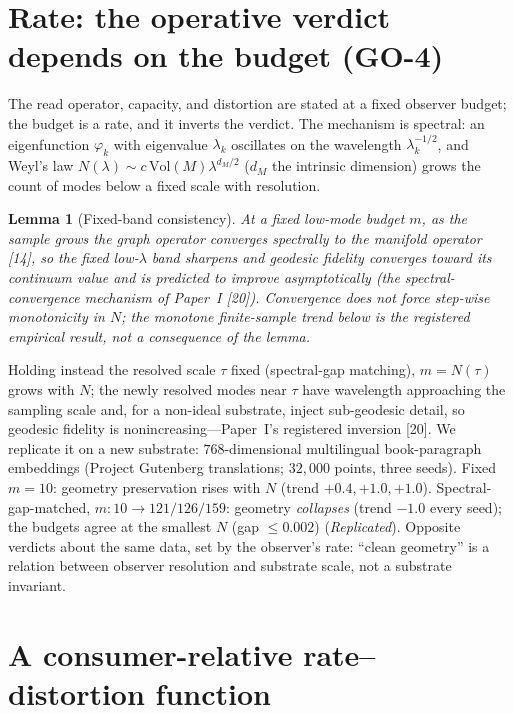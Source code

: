 \documentclass[lettersize,onecolumn]{IEEEtran}
\newtheorem{lemma}{Lemma}
\theoremstyle{definition}
\theoremstyle{remark}
\begin{document}
\section{Rate: the operative verdict depends on the budget (GO-4)}\label{sec:rate}

The read operator, capacity, and distortion are stated at a fixed observer budget;
the budget is a rate, and it inverts the verdict. The mechanism is spectral: an
eigenfunction $\varphi_k$ with eigenvalue $\lambda_k$ oscillates on the wavelength
$\lambda_k^{-1/2}$, and Weyl's law $N(\lambda)\sim c\,\mathrm{Vol}(M)\lambda^{d_M/2}$
($d_M$ the intrinsic dimension) grows the count of modes below a fixed scale with
resolution.

\begin{lemma}[Fixed-band consistency]\label{lem:band}
At a fixed low-mode budget $m$, as the sample grows the graph operator converges
spectrally to the manifold operator [14], so the fixed low-$\lambda$
band sharpens and geodesic fidelity \emph{converges toward its continuum value} and is
predicted to improve asymptotically (the spectral-convergence mechanism of
Paper~I [20]). Convergence does not force step-wise monotonicity in $N$; the
monotone finite-sample trend below is the \emph{registered empirical} result, not a
consequence of the lemma.
\end{lemma}

Holding instead the resolved scale $\tau$ fixed (spectral-gap matching), $m=N(\tau)$
grows with $N$; the newly resolved modes near $\tau$ have wavelength approaching the
sampling scale and, for a non-ideal substrate, inject sub-geodesic detail, so
geodesic fidelity is nonincreasing---Paper~I's registered inversion [20]. We
replicate it on a new substrate: $768$-dimensional multilingual book-paragraph
embeddings (Project Gutenberg translations; $32{,}000$ points, three seeds). Fixed
$m=10$: geometry preservation rises with $N$ (trend $+0.4,+1.0,+1.0$).
Spectral-gap-matched, $m:10\to121/126/159$: geometry \emph{collapses} (trend $-1.0$
every seed); the budgets agree at the smallest $N$ (gap $\le0.002$)
(\emph{Replicated}). Opposite verdicts about the same data, set by the observer's
rate: ``clean geometry'' is a relation between observer resolution and substrate
scale, not a substrate invariant.

\section{A consumer-relative rate--distortion function}\label{sec:rd}
\end{document}
